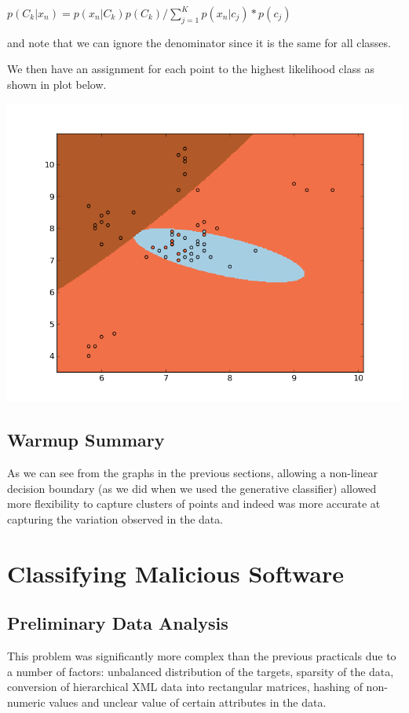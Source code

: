 \documentclass[11pt, oneside]{article}   	%
\begin{document}
$p(C_k |x_n) = p(x_n |C_k)  p(C_k) / \sum\limits_{j=1}^K p(x_n | c_j) * p(c_j)$

and note that we can ignore the denominator since it is the same for all classes.

We then have an assignment for each point to the highest likelihood class as shown in plot below.

\begin{center}
\includegraphics[scale=.6]{generative_classifier}
\end{center}

\subsection*{Warmup Summary}

As we can see from the graphs in the previous sections, allowing a non-linear decision boundary (as we did when we used the generative classifier) allowed more flexibility to capture clusters of points and indeed was more accurate at capturing the variation observed in the data.

\section*{Classifying Malicious Software}

\subsection*{Preliminary Data Analysis}

This problem was significantly more complex than the previous practicals due to a number of factors: unbalanced distribution of the targets, sparsity of the data, conversion of hierarchical XML data into rectangular matrices, hashing of non-numeric values and unclear value of certain attributes in the data. 
\end{document}
